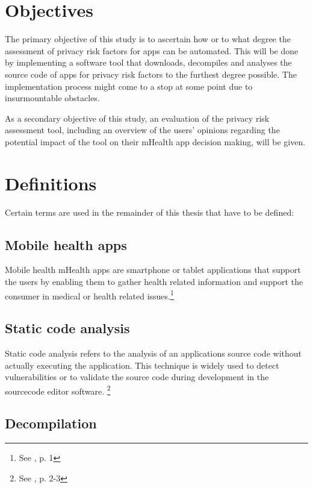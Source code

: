 \documentclass[
	a4paper,
	oneside,
	12pt,
	liststotocnumbered
]{article}
\let\cite\textcite
\begin{document}
\section{Objectives}

The primary objective of this study is to ascertain how or to what degree the assessment of privacy risk factors for \mH apps can be automated.
This will be done by implementing a software tool that downloads, decompiles and analyses the source code of \mH apps for privacy risk factors to the furthest degree possible.
The implementation process might come to a stop at some point due to insurmountable obstacles.

As a secondary objective of this study, an evaluation of the privacy risk assessment tool, including an overview of the users’ opinions regarding the potential impact of the tool on their mHealth app decision making, will be given.

\section{Definitions}
Certain terms are used in the remainder of this thesis that have to be defined:

\subsection{Mobile health apps}

Mobile health \acs{mHealth} apps are smartphone or tablet applications that support the users by enabling them to gather health related information and support the consumer in medical or health related issues.\footnote{See \cite{Dehling2015b}, p. 1}

\subsection{Static code analysis}

Static code analysis refers to the analysis of an applications source code without actually executing the application. 
This technique is widely used to detect vulnerabilities or to validate the source code during development in the sourcecode editor software. \footnote{See \cite{bardas2010static}, p. 2-3}

\subsection{Decompilation}
\end{document}
